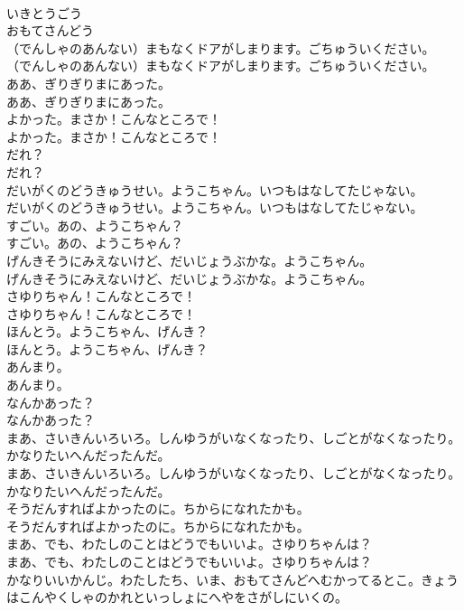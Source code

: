 \documentclass[8pt]{extreport}
\begin{document}
\begin{CJK}{UTF8}{min}
\\	いきとうごう
\\	おもてさんどう
\\	（でんしゃのあんない）まもなくドアがしまります。ごちゅういください。	
\\	（でんしゃのあんない）まもなくドアがしまります。ごちゅういください。 
\\	ああ、ぎりぎりまにあった。	
\\	ああ、ぎりぎりまにあった。 
\\	よかった。まさか！こんなところで！	
\\	よかった。まさか！こんなところで！ 
\\	だれ？	
\\	だれ？ 
\\	だいがくのどうきゅうせい。ようこちゃん。いつもはなしてたじゃない。	
\\	だいがくのどうきゅうせい。ようこちゃん。いつもはなしてたじゃない。 
\\	すごい。あの、ようこちゃん？	
\\	すごい。あの、ようこちゃん？ 
\\	げんきそうにみえないけど、だいじょうぶかな。ようこちゃん。	
\\	げんきそうにみえないけど、だいじょうぶかな。ようこちゃん。 
\\	さゆりちゃん！こんなところで！	
\\	さゆりちゃん！こんなところで！ 
\\	ほんとう。ようこちゃん、げんき？	
\\	ほんとう。ようこちゃん、げんき？ 
\\	あんまり。	
\\	あんまり。 
\\	なんかあった？	
\\	なんかあった？ 
\\	まあ、さいきんいろいろ。しんゆうがいなくなったり、しごとがなくなったり。かなりたいへんだったんだ。	
\\	まあ、さいきんいろいろ。しんゆうがいなくなったり、しごとがなくなったり。かなりたいへんだったんだ。 
\\	そうだんすればよかったのに。ちからになれたかも。	
\\	そうだんすればよかったのに。ちからになれたかも。 
\\	まあ、でも、わたしのことはどうでもいいよ。さゆりちゃんは？	
\\	まあ、でも、わたしのことはどうでもいいよ。さゆりちゃんは？ 
\\	かなりいいかんじ。わたしたち、いま、おもてさんどへむかってるとこ。きょうはこんやくしゃのかれといっしょにへやをさがしにいくの。	

\end{CJK}
\end{document}
